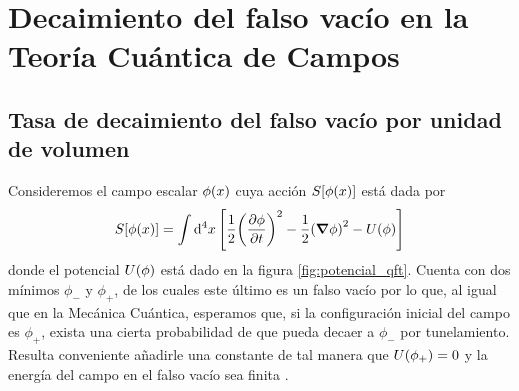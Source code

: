 \chapter[Decaimiento del falso vacío en la TCC]{Decaimiento del falso vacío en la Teoría Cuántica de Campos}


\section{Tasa de decaimiento del falso vacío por unidad de volumen
}

Consideremos el campo escalar $\phi\qty(x)$ cuya acción $S\qty[\phi\qty(x)]$ está dada por %
\begin{equation} \label{eq:accion_qft}
S\qty[\phi\qty(x)] = \int \dd[4]{x} \qty[\frac{1}{2}\qty(\pdv{\phi}{t})^2 - \frac{1}{2}\qty(\grad{\phi})^2 - U\qty(\phi) ]
\end{equation}
donde el potencial 
$U\qty(\phi)$ está dado en la figura \ref{fig:potencial_qft}. Cuenta con dos mínimos $\phi_-$ y $\phi_+$, de los cuales este último es un falso vacío por lo que, al igual que en la Mecánica Cuántica, 
esperamos que, si la configuración inicial del campo es $\phi_+$, 
exista una cierta probabilidad de que
pueda decaer a $\phi_-$ por tunelamiento. Resulta conveniente añadirle una constante 
de tal manera que $U\qty(\phi_+) = 0$ y la energía del campo en el falso vacío sea finita \cite{andreassen2017precision}. 
